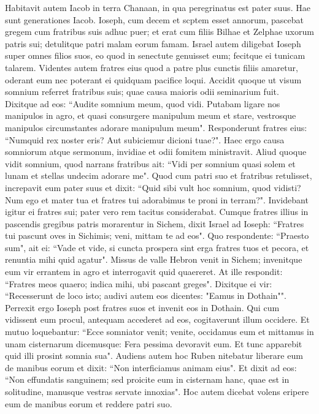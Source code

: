 \begin{biblechapter}  
\verse Habitavit autem Iacob in terra Chanaan, in qua peregrinatus est pater suus. 
\verse Hae sunt generationes Iacob. Ioseph, cum decem et scptem esset annorum, pascebat gregem cum fratribus suis adhuc puer; et erat cum filiis Bilhae et Zelphae uxorum patris sui; detulitque patri malam eorum famam. 
\verse Israel autem diligebat Ioseph super omnes filios suos, eo quod in senectute genuisset eum; fecitque ei tunicam talarem. 
\verse Videntes autem fratres eius quod a patre plus cunctis filiis amaretur, oderant eum nec poterant ei quidquam pacifice loqui. 
\verse Accidit quoque ut visum somnium referret fratribus suis; quae causa maioris odii seminarium fuit. 
\verse Dixitque ad eos: “Audite somnium meum, quod vidi.  
\verse Putabam ligare nos manipulos in agro, et quasi consurgere manipulum meum et stare, vestrosque manipulos circumstantes adorare manipulum meum". 
\verse Responderunt fratres eius: “Numquid rex noster eris? Aut subiciemur dicioni tuae?". Haec ergo causa somniorum atque sermonum, invidiae et odii fomitem ministravit. 
\verse Aliud quoque vidit somnium, quod narrans fratribus ait: “Vidi per somnium quasi solem et lunam et stellas undecim adorare me". 
\verse Quod cum patri suo et fratribus retulisset, increpavit eum pater suus et dixit: “Quid sibi vult hoc somnium, quod vidisti? Num ego et mater tua et fratres tui adorabimus te proni in terram?". 
\verse Invidebant igitur ei fratres sui; pater vero rem tacitus considerabat. 
\verse Cumque fratres illius in pascendis gregibus patris morarentur in Sichem,  
\verse dixit Israel ad Ioseph: “Fratres tui pascunt oves in Sichimis; veni, mittam te ad eos". Quo respondente: 
\verse “Praesto sum", ait ei: “Vade et vide, si cuncta prospera sint erga fratres tuos et pecora, et renuntia mihi quid agatur". Missus de valle Hebron venit in Sichem; 
\verse invenitque eum vir errantem in agro et interrogavit quid quaereret. 
\verse At ille respondit: “Fratres meos quaero; indica mihi, ubi pascant greges". 
\verse Dixitque ei vir: “Recesserunt de loco isto; audivi autem eos dicentes: "Eamus in Dothain"". Perrexit ergo Ioseph post fratres suos et invenit eos in Dothain. 
\verse Qui cum vidissent eum procul, antequam accederet ad eos, cogitaverunt illum occidere. 
\verse Et mutuo loquebantur: “Ecce somniator venit; 
\verse venite, occidamus eum et mittamus in unam cisternarum dicemusque: Fera pessima devoravit eum. Et tunc apparebit quid illi prosint somnia sua". 
\verse Audiens autem hoc Ruben nitebatur liberare eum de manibus eorum et dixit:  
\verse “Non interficiamus animam eius". Et dixit ad eos: “Non effundatis sanguinem; sed proicite eum in cisternam hanc, quae est in solitudine, manusque vestras servate innoxias". Hoc autem dicebat volens eripere eum de manibus eorum et reddere patri suo. 

\end{biblechapter}
